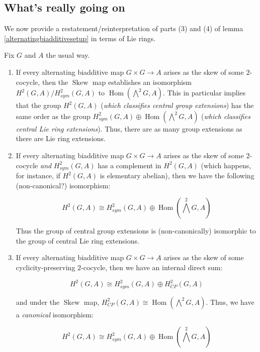 \documentclass[10pt]{amsart}
\newcommand{\Skew}{\operatorname{Skew}}
\begin{document}
\subsection{What's really going on}

We now provide a restatement/reinterpretation of parts (3) and (4) of
lemma \ref{alternatingbiadditivesetup} in terms of Lie rings.

\begin{lemma}\label{Lieinterpretationalternatingbiadditivesetup}
  Fix $G$ and $A$ the usual way.

  \begin{enumerate}
  \item If every alternating biadditive map $G \times G \to A$ arises
    as the skew of some $2$-cocycle, then the $\Skew$ map establishes
    an isomorphism $H^2(G,A)/H^2_{sym}(G,A)$ to
    $\operatorname{Hom}(\bigwedge^2G,A)$. This in particular implies
    that the group $H^2(G,A)$ ({\em which classifies central group
    extensions}) has the same order as the group $H^2_{sym}(G,A)
    \oplus \operatorname{Hom}(\bigwedge^2G,A)$ ({\em which classifies
    central Lie ring extensions}). Thus, there are as many group
    extensions as there are Lie ring extensions.
  \item If every alternating biadditive map $G \times G \to A$ arises
    as the skew of some $2$-cocycle {\em and} $H^2_{sym}(G,A)$ has a
    complement in $H^2(G,A)$ (which happens, for instance, if
    $H^2(G,A)$ is elementary abelian), then we have the following
    (non-canonical?)  isomorphism:

    $$H^2(G,A) \cong H^2_{sym}(G,A) \oplus \operatorname{Hom}(\bigwedge^2G,A)$$

    Thus the group of central group extensions is (non-canonically)
    isomorphic to the group of central Lie ring extensions.
  \item If every alternating biadditive map $G \times G \to A$ arises
    as the skew of some cyclicity-preserving $2$-cocycle, then we have
    an internal direct sum:

    $$H^2(G,A) \cong H^2_{sym}(G,A) \oplus H^2_{CP}(G,A)$$

    and under the $\Skew$ map, $H^2_{CP}(G,A) \cong
    \operatorname{Hom}(\bigwedge^2G,A)$. Thus, we have a {\em
    canonical} isomorphism:

    $$H^2(G,A) \cong H^2_{sym}(G,A) \oplus \operatorname{Hom}(\bigwedge^2G,A)$$


\end{enumerate}
\end{lemma}
\end{document}

